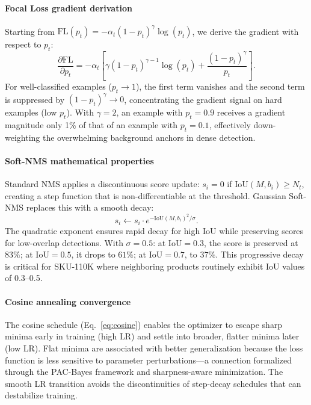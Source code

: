 \documentclass[conference]{IEEEtran}
\begin{document}
\paragraph{Focal Loss gradient derivation}
Starting from $\text{FL}(p_t) = -\alpha_t (1-p_t)^\gamma \log(p_t)$,
we derive the gradient with respect to $p_t$:
\begin{equation}
  \frac{\partial \text{FL}}{\partial p_t} = -\alpha_t \left[
    \gamma (1-p_t)^{\gamma-1} \log(p_t) + \frac{(1-p_t)^\gamma}{p_t}
  \right].
  \label{eq:focal_grad}
\end{equation}
For well-classified examples ($p_t \to 1$), the first term vanishes and
the second term is suppressed by $(1-p_t)^\gamma \to 0$, concentrating
the gradient signal on hard examples (low $p_t$). With $\gamma = 2$,
an example with $p_t = 0.9$ receives a gradient magnitude only 1\% of
that of an example with $p_t = 0.1$, effectively down-weighting the
overwhelming background anchors in dense detection.

\paragraph{Soft-NMS mathematical properties}
Standard NMS applies a discontinuous score update:
$s_i = 0$ if $\text{IoU}(M, b_i) \geq N_t$, creating a step function
that is non-differentiable at the threshold. Gaussian Soft-NMS replaces
this with a smooth decay:
\begin{equation}
  s_i \leftarrow s_i \cdot e^{-\text{IoU}(M, b_i)^2 / \sigma}.
  \label{eq:softnms_smooth}
\end{equation}
The quadratic exponent ensures rapid decay for high IoU while
preserving scores for low-overlap detections. With $\sigma = 0.5$:
at IoU$= 0.3$, the score is preserved at $83\%$; at IoU$= 0.5$,
it drops to $61\%$; at IoU$= 0.7$, to $37\%$. This progressive
decay is critical for SKU-110K where neighboring products routinely
exhibit IoU values of 0.3--0.5.

\paragraph{Cosine annealing convergence}
The cosine schedule (Eq.~\ref{eq:cosine}) enables the optimizer to
escape sharp minima early in training (high LR) and settle into
broader, flatter minima later (low LR). Flat minima are associated
with better generalization because the loss function is less sensitive
to parameter perturbations---a connection formalized through the
PAC-Bayes framework and sharpness-aware minimization. The smooth
LR transition avoids the discontinuities of step-decay schedules
that can destabilize training.
\end{document}
